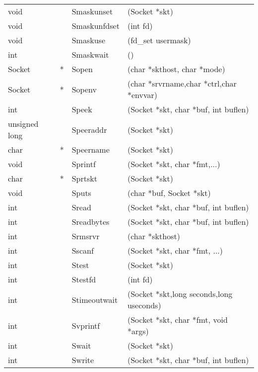 \documentclass[12pt]{article}
\begin{document}
\begin{center}
\begin{tabular}{||ll|l|l||}
  void          &   & Smaskunset     & (Socket *skt)                            \\
  void          &   & Smaskunfdset   & (int fd)                                 \\
  void          &   & Smaskuse       & (fd\_set usermask)                       \\
  int           &   & Smaskwait      & ()                                       \\
  Socket        & * & Sopen          & (char *skthost, char *mode)              \\
  Socket        & * & Sopenv         & (char *srvrname,char *ctrl,char *envvar) \\
  int           &   & Speek          & (Socket *skt, char *buf, int buflen)     \\
  unsigned long &   & Speeraddr      & (Socket *skt)                            \\
  char          & * & Speername      & (Socket *skt)                            \\
  void          &   & Sprintf        & (Socket *skt, char *fmt,...)             \\
  char          & * & Sprtskt        & (Socket *skt)                            \\
  void          &   & Sputs          & (char *buf, Socket *skt)                 \\
  int           &   & Sread          & (Socket *skt, char *buf, int buflen)     \\
  int           &   & Sreadbytes     & (Socket *skt, char *buf, int buflen)     \\
  int           &   & Srmsrvr        & (char *skthost)                          \\
  int           &   & Sscanf         & (Socket *skt, char *fmt, ...)            \\
  int           &   & Stest          & (Socket *skt)                            \\
  int           &   & Stestfd        & (int fd)                                 \\
  int           &   & Stimeoutwait   & (Socket *skt,long seconds,long useconds) \\
  int           &   & Svprintf       & (Socket *skt, char *fmt, void *args)     \\
  int           &   & Swait          & (Socket *skt)                            \\
  int           &   & Swrite         & (Socket *skt, char *buf, int buflen)     \\
  \hline\hline
  \end{tabular}
\end{center}
\end{document}
